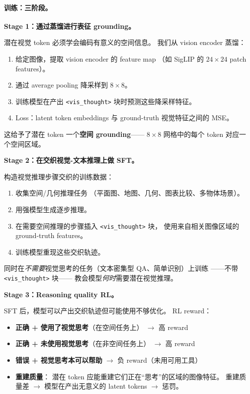 \documentclass[12pt,a4paper]{article}
\begin{document}
\paragraph{训练：三阶段。}

\textbf{Stage 1：通过蒸馏进行表征 grounding。}

潜在视觉 token 必须学会编码有意义的空间信息。
我们从 vision encoder 蒸馏：
\begin{enumerate}[leftmargin=2em]
  \item 给定图像，提取 vision encoder 的 feature map
    （如 SigLIP 的 $24 \times 24$ patch features）。
  \item 通过 average pooling 降采样到 $8 \times 8$。
  \item 训练模型在产出 \texttt{<vis\_thought>} 块时预测这些降采样特征。
  \item Loss：latent token embeddings 与 ground-truth 视觉特征之间的 MSE。
\end{enumerate}

这给予了潜在 token 一个\textbf{空间 grounding}——
$8 \times 8$ 网格中的每个 token 对应一个空间区域。

\textbf{Stage 2：在交织视觉-文本推理上做 SFT。}

构造视觉推理步骤交织的训练数据：
\begin{enumerate}[leftmargin=2em]
  \item 收集空间/几何推理任务
    （平面图、地图、几何、图表比较、多物体场景）。
  \item 用强模型生成逐步推理。
  \item 在需要空间推理的步骤插入 \texttt{<vis\_thought>} 块，
    使用来自相关图像区域的 ground-truth features。
  \item 训练模型重现这些交织轨迹。
\end{enumerate}

同时在\textit{不需要}视觉思考的任务（文本密集型 QA、简单识别）上训练
——不带 \texttt{<vis\_thought>} 块——
教会模型\textit{何时}需要潜在视觉推理。

\textbf{Stage 3：Reasoning quality RL。}

SFT 后，模型可以产出交织轨迹但可能使用不够优化。
RL reward：
\begin{itemize}[leftmargin=2em]
  \item \textbf{正确 + 使用了视觉思考}（在空间任务上）
    $\rightarrow$ 高 reward
  \item \textbf{正确 + 未使用视觉思考}（在非空间任务上）
    $\rightarrow$ 高 reward
  \item \textbf{错误 + 视觉思考本可以帮助}
    $\rightarrow$ 负 reward（未用可用工具）
  \item \textbf{重建质量}：
    潜在 token 应能重建它们正在``思考''的区域的图像特征。
    重建质量差 $\rightarrow$ 模型在产出无意义的 latent tokens
    $\rightarrow$ 惩罚。
\end{itemize}
\end{document}
